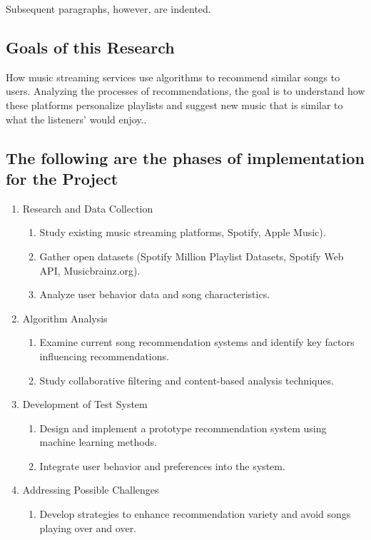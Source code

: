 \documentclass[runningheads]{llncs}
\begin{document}
Subsequent paragraphs, however, are indented.

\subsection{Goals of this Research} 
 How music streaming services use algorithms to recommend similar songs to users. 
 Analyzing the processes of recommendations, the goal is to understand how these platforms personalize playlists and suggest new music that is similar to what the listeners' would enjoy..

\subsection{The following are the phases of implementation for the Project}
\begin{enumerate}
\item Research and Data Collection
    \begin{enumerate}
        \item Study existing music streaming platforms, Spotify, Apple Music).
        \item Gather open datasets (Spotify Million Playlist Datasets, Spotify Web API, Musicbrainz.org).
        \item Analyze user behavior data and song characteristics.
    \end{enumerate}
\item Algorithm Analysis
    \begin{enumerate}
        \item Examine current song recommendation systems and identify key factors influencing recommendations. 
        \item Study collaborative filtering and content-based analysis techniques. 
    \end{enumerate}
\item Development of Test System
    \begin{enumerate}
        \item Design and implement a prototype recommendation system using machine learning methods. 
        \item Integrate user behavior and preferences into the system. 
    \end{enumerate}
\item Addressing Possible Challenges
    \begin{enumerate}
        \item Develop strategies to enhance recommendation variety and avoid songs playing over and over. 

\end{enumerate}
\end{enumerate}
\end{document}
